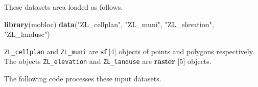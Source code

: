 \documentclass[
]{article}
\newenvironment{Shaded}{\begin{snugshade}}{\end{snugshade}}
\newcommand{\KeywordTok}[1]{\textcolor[rgb]{0.13,0.29,0.53}{\textbf{#1}}}
\newcommand{\NormalTok}[1]{#1}
\newcommand{\StringTok}[1]{\textcolor[rgb]{0.31,0.60,0.02}{#1}}
\begin{document}
These datasets area loaded as follows.

\begin{Shaded}
\begin{Highlighting}[]
\KeywordTok{library}\NormalTok{(mobloc)}
\KeywordTok{data}\NormalTok{(}\StringTok{"ZL_cellplan"}\NormalTok{, }\StringTok{"ZL_muni"}\NormalTok{, }\StringTok{"ZL_elevation"}\NormalTok{, }\StringTok{"ZL_landuse"}\NormalTok{)}
\end{Highlighting}
\end{Shaded}

\texttt{ZL\_cellplan} and \texttt{ZL\_muni} are \textbf{sf} {[}4{]}
objects of points and polygons respectively. The objects
\texttt{ZL\_elevation} and \texttt{ZL\_landuse} are \textbf{raster}
{[}5{]} objects.

The following code processes these input datasets.
\end{document}
